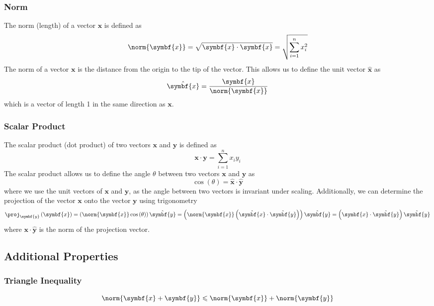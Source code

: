 \documentclass{article}
\begin{document}
\subsubsection{Norm}
The norm (length) of a vector \(\symbf{x}\) is defined as
\begin{equation*}
    \norm{\symbf{x}} = \sqrt{\symbf{x} \cdot \symbf{x}} = \sqrt{\sum_{i=1}^n x_i^2}
\end{equation*}
The norm of a vector \(\symbf{x}\) is the distance from the origin to the tip of the vector.
This allows us to define the unit vector \(\hat{\symbf{x}}\) as
\begin{equation*}
    \hat{\symbf{x}} = \frac{\symbf{x}}{\norm{\symbf{x}}}
\end{equation*}
which is a vector of length 1 in the same direction as \(\symbf{x}\).
\subsubsection{Scalar Product}
The scalar product (dot product) of two vectors \(\symbf{x}\) and
\(\symbf{y}\) is defined as
\begin{equation*}
    \symbf{x} \cdot \symbf{y} = \sum_{i=1}^n x_i y_i
\end{equation*}
The scalar product allows us to define the angle \(\theta\) between two vectors \(\symbf{x}\) and \(\symbf{y}\) as
\begin{equation*}
    \cos{\left( \theta \right)} = \hat{\symbf{x}} \cdot \hat{\symbf{y}}
\end{equation*}
where we use the unit vectors of \(\symbf{x}\) and \(\symbf{y}\), as the angle between two vectors is invariant under scaling.
Additionally, we can determine the projection of the vector \(\symbf{x}\) onto the vector \(\symbf{y}\) using trigonometry
\begin{equation*}
    \proj_{\symbf{y}} \left( \symbf{x} \right) = \left( \norm{\symbf{x}} \cos{\left( \theta \right)} \right) \hat{\symbf{y}} = \left( \norm{\symbf{x}} \left( \hat{\symbf{x}} \cdot \hat{\symbf{y}} \right) \right) \hat{\symbf{y}} = \left( \symbf{x} \cdot \hat{\symbf{y}} \right) \hat{\symbf{y}}
\end{equation*}
where \(\symbf{x} \cdot \hat{\symbf{y}}\) is the norm of the projection vector.
\subsection{Additional Properties}
\subsubsection{Triangle Inequality}
\begin{equation*}
    \norm{\symbf{x} + \symbf{y}} \leqslant \norm{\symbf{x}} + \norm{\symbf{y}}
\end{equation*}
\end{document}
